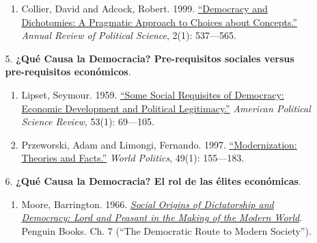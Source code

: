 \documentclass[letterpaper]{article}
\begin{document}
\begin{enumerate}
\begin{enumerate}
\begin{enumerate}
						\item Collier, David and Adcock, Robert. 1999. \href{https://github.com/hbahamonde/Ciencia_Politica_I/raw/master/Readings/Collier_Adcock.pdf}{``Democracy and Dichotomies: A Pragmatic Approach to Choices about Concepts.''} \emph{Annual Review of Political Science}, 2(1): 537---565.

					\end{enumerate}
			
				\item[5.] {\bf ¿Qu\'e Causa la Democracia? Pre-requisitos sociales versus pre-requisitos econ\'omicos}.  
					\begin{enumerate}
						\item Lipset, Seymour. 1959. \href{https://github.com/hbahamonde/Ciencia_Politica_I/raw/master/Readings/Lipset.pdf}{``Some Social Requisites of Democracy: Economic Development and Political Legitimacy.''} \emph{American Political Science Review}, 53(1): 69---105.

						\item Przeworski, Adam and Limongi, Fernando. 1997. \href{https://github.com/hbahamonde/Ciencia_Politica_I/raw/master/Readings/Przeworski_Limongi_1997.pdf}{``Modernization: Theories and Facts.''} \emph{World Politics}, 49(1): 155---183.
						
					\end{enumerate}
				
				

				\item[6.] {\bf ¿Qu\'e Causa la Democracia? El rol de las \'elites econ\'omicas}. 
					\begin{enumerate}
						\item Moore, Barrington. 1966. \href{https://github.com/hbahamonde/Ciencia_Politica_I/raw/master/Readings/Moore.pdf}{\emph{Social Origins of Dictatorship and Democracy: Lord and Peasant in the Making of the Modern World}}. Penguin Books. Ch. 7 (``The Democratic Route to Modern Society'').
						

\end{enumerate}
\end{enumerate}
\end{enumerate}
\end{document}
